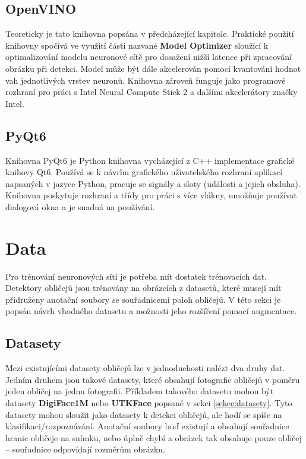 \subsection*{OpenVINO}
Teoreticky je tato knihovna popsána v předcházející kapitole. Praktické použití knihovny spočívá ve využití části nazvané \textbf{Model Optimizer} sloužící k optimalizování modelu neuronové sítě pro dosažení nižší latence při zpracování obrázku při detekci. Model může být dále akcelerován pomocí kvantování hodnot vah jednotlivých vrstev neuronů. Knihovna zároveň funguje jako programové rozhraní pro práci s Intel Neural Compute Stick 2 a dalšími akcelerátory značky Intel.

\subsection*{PyQt6}
Knihovna PyQt6 je Python knihovna vycházející z C++ implementace grafické knihovy Qt6. Používá se k návrhu grafického uživatelského rozhraní aplikací napsaných v jazyce Python, pracuje se signály a sloty (události a jejich obsluha). Knihovna poskytuje rozhraní a třídy pro práci s více vlákny, umožňuje používat dialogová okna a je snadná na používání.


\section{Data}
\label{sekce:data_navrh}
Pro trénování neuronových sítí je potřeba mít dostatek trénovacích dat. Detektory obličejů jsou trénovány na obrázcích z datasetů, které musejí mít přidruženy anotační soubory se souřadnicemi poloh obličejů. V této sekci je popsán návrh vhodného datasetu a možnosti jeho rozšíření pomocí augmentace.

\subsection*{Datasety}
Mezi existujícími datasety obličejů lze v jednoduchosti nalézt dva druhy dat. Jedním druhem jsou takové datasety, které obsahují fotografie obličejů v poměru jeden obličej na jednu fotografii. Příkladem takového datasetu mohou být datasety \textbf{DigiFace1M} nebo \textbf{UTKFace} popsané v sekci \ref{sekce:datasety}. Tyto datasety mohou sloužit jako datasety k detekci obličejů, ale hodí se spíše na klasifikaci/rozpoznávání. Anotační soubory buď existují a obsahují souřadnice hranic obličeje na snímku, nebo úplně chybí a obrázek tak obsahuje pouze obličej -- souřadnice odpovídají rozměrům obrázku.

